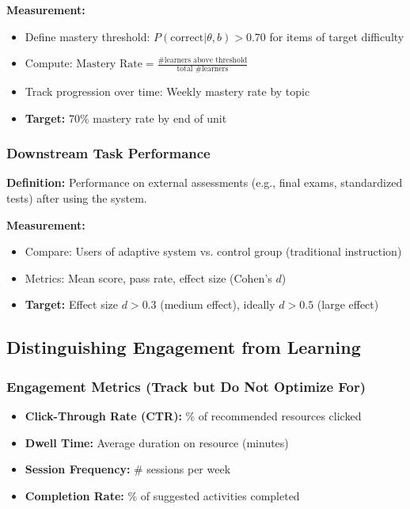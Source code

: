 \documentclass[11pt,letterpaper]{article}
\begin{document}
\textbf{Measurement:}
\begin{itemize}
\item Define mastery threshold: $P(\text{correct} | \theta, b) > 0.70$ for items of target difficulty
\item Compute: $\text{Mastery Rate} = \frac{\text{\# learners above threshold}}{\text{total \# learners}}$
\item Track progression over time: Weekly mastery rate by topic
\item \textbf{Target:} 70\% mastery rate by end of unit
\end{itemize}

\subsubsection{Downstream Task Performance}\label{subsubsec:downstream-performance}

\textbf{Definition:} Performance on external assessments (e.g., final exams, standardized tests) after using the system.

\textbf{Measurement:}
\begin{itemize}
\item Compare: Users of adaptive system vs. control group (traditional instruction)
\item Metrics: Mean score, pass rate, effect size (Cohen's $d$)
\item \textbf{Target:} Effect size $d > 0.3$ (medium effect), ideally $d > 0.5$ (large effect)
\end{itemize}

\subsection{Distinguishing Engagement from Learning}\label{subsec:engagement-vs-learning}

\subsubsection{Engagement Metrics (Track but Do Not Optimize For)}\label{subsubsec:engagement-metrics}

\begin{itemize}
\item \textbf{Click-Through Rate (CTR):} \% of recommended resources clicked
\item \textbf{Dwell Time:} Average duration on resource (minutes)
\item \textbf{Session Frequency:} \# sessions per week
\item \textbf{Completion Rate:} \% of suggested activities completed
\end{itemize}
\end{document}
